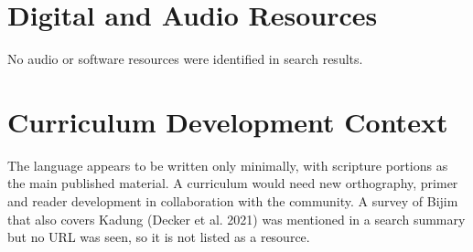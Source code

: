 \documentclass[12pt]{article}
\begin{document}
\section{Digital and Audio Resources}
No audio or software resources were identified in search results.

\section{Curriculum Development Context}
The language appears to be written only minimally, with scripture portions as the main published material. A curriculum would need new orthography, primer and reader development in collaboration with the community. A survey of Bijim that also covers Kadung (Decker et al. 2021) was mentioned in a search summary but no URL was seen, so it is not listed as a resource.
\end{document}
